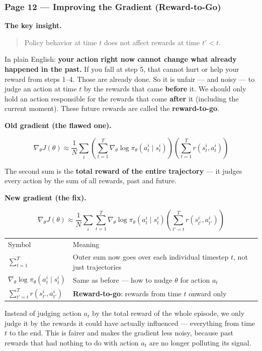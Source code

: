 \subsubsection*{Page 12 --- Improving the Gradient (Reward-to-Go)}

\textbf{The key insight.}

\begin{quote}
  Policy behavior at time $t$ does not affect rewards at time $t' < t$.
\end{quote}

In plain English: \textbf{your action right now cannot change what already happened in the
past.} If you fall at step 5, that cannot hurt or help your reward from steps 1--4. Those
are already done. So it is unfair --- and noisy --- to judge an action at time $t$ by the
rewards that came \textbf{before} it. We should only hold an action responsible for the
rewards that come \textbf{after} it (including the current moment). These future rewards are
called the \textbf{reward-to-go}.

\medskip
\textbf{Old gradient (the flawed one).}

\[
  \nabla_\theta J(\theta)
  \approx \frac{1}{N}\sum_i
    \left(\sum_{t=1}^T\nabla_\theta\log\pi_\theta(a_t^i\mid s_t^i)\right)
    \left(\sum_{t=1}^T r(s_t^i,a_t^i)\right)
\]

The second sum is the \textbf{total reward of the entire trajectory} --- it judges every
action by the sum of all rewards, past and future.

\medskip
\textbf{New gradient (the fix).}

\[
  \nabla_\theta J(\theta)
  \approx \frac{1}{N}\sum_i\sum_{t=1}^T
    \nabla_\theta\log\pi_\theta(a_t^i\mid s_t^i)
    \left(\sum_{t'=t}^{T} r(s_{t'}^i,a_{t'}^i)\right)
\]

\begin{tabular}{ll}
  Symbol & Meaning \\[4pt]
  $\sum_{t=1}^T$ & Outer sum now goes over each individual timestep $t$, not just trajectories \\
  $\nabla_\theta\log\pi_\theta(a_t^i\mid s_t^i)$ & Same as before --- how to nudge $\theta$ for action $a_t$ \\
  $\sum_{t'=t}^{T} r(s_{t'}^i,a_{t'}^i)$ & \textbf{Reward-to-go}: rewards from time $t$ onward only \\
\end{tabular}

\medskip
Instead of judging action $a_t$ by the total reward of the whole episode, we only judge it by
the rewards it could have actually influenced --- everything from time $t$ to the end. This is
fairer and makes the gradient less noisy, because past rewards that had nothing to do with
action $a_t$ are no longer polluting its signal.

